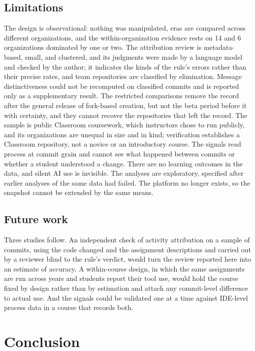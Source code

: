 \documentclass[acmsmall,screen,review,anonymous]{acmart}
\begin{document}
\subsection{Limitations}
\label{sec:limitations}

The design is observational: nothing was manipulated, eras are compared across different organizations, and the within-organization evidence rests on 14 and 6 organizations dominated by one or two. The attribution review is metadata-based, small, and clustered, and its judgments were made by a language model and checked by the author; it indicates the kinds of the rule's errors rather than their precise rates, and team repositories are classified by elimination. Message distinctiveness could not be recomputed on classified commits and is reported only as a supplementary result. The restricted comparisons remove the record after the general release of fork-based creation, but not the beta period before it with certainty, and they cannot recover the repositories that left the record. The sample is public Classroom coursework, which instructors chose to run publicly, and its organizations are unequal in size and in kind; verification establishes a Classroom repository, not a novice or an introductory course. The signals read process at commit grain and cannot see what happened between commits or whether a student understood a change. There are no learning outcomes in the data, and silent AI use is invisible. The analyses are exploratory, specified after earlier analyses of the same data had failed. The platform no longer exists, so the snapshot cannot be extended by the same means.

\subsection{Future work}

Three studies follow. An independent check of activity attribution on a sample of commits, using the code changed and the assignment descriptions and carried out by a reviewer blind to the rule's verdict, would turn the review reported here into an estimate of accuracy. A within-course design, in which the same assignments are run across years and students report their tool use, would hold the course fixed by design rather than by estimation and attach any commit-level difference to actual use. And the signals could be validated one at a time against IDE-level process data in a course that records both.

\section{Conclusion}
\label{sec:conclusion}
\end{document}
